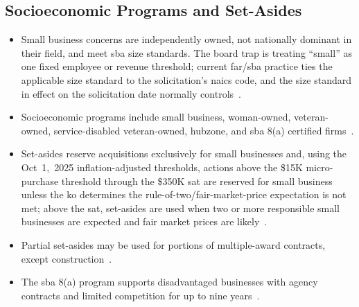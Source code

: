 \documentclass[../main.tex]{subfiles}
\begin{document}
\subsection{Socioeconomic Programs and Set-Asides}
\begin{itemize}
  \item Small business concerns are independently owned, not nationally dominant in their field, and meet \ac{sba} size standards. The board trap is treating ``small'' as one fixed employee or revenue threshold; current \ac{far}/\ac{sba} practice ties the applicable size standard to the solicitation's \ac{naics} code, and the size standard in effect on the solicitation date normally controls~\autocite{edo-3-2-2-solicitation-prep-2025,SBA-Size-Standards-2026,FAR-19-102-Size-Standards}.
  \item Socioeconomic programs include small business, woman-owned, veteran-owned, service-disabled veteran-owned, \ac{hubzone}, and \ac{sba} 8(a) certified firms~\autocite{edo-3-2-2-solicitation-prep-2025}.
  \item Set-asides reserve acquisitions exclusively for small businesses and, using the Oct~1,~2025 inflation-adjusted thresholds, actions above the \$15K micro-purchase threshold through the \$350K \ac{sat} are reserved for small business unless the \ac{ko} determines the rule-of-two/fair-market-price expectation is not met; above the \ac{sat}, set-asides are used when two or more responsible small businesses are expected and fair market prices are likely~\autocite{edo-3-2-2-solicitation-prep-2025,FAR-19-502-2-Set-Asides,AcquisitionGov-Threshold-Changes-2025}.
  \item Partial set-asides may be used for portions of multiple-award contracts, except construction~\autocite{edo-3-2-2-solicitation-prep-2025}.
  \item The \ac{sba} 8(a) program supports disadvantaged businesses with agency contracts and limited competition for up to nine years~\autocite{edo-3-2-2-solicitation-prep-2025}.
\end{itemize}
\end{document}
